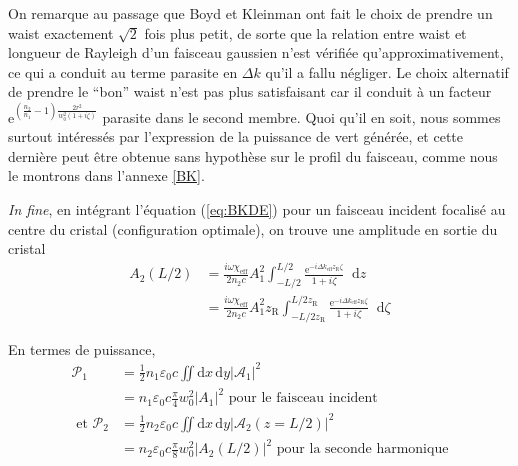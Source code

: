 \documentclass[11pt,a4paper]{article}
\newcommand{\diff}{\mathop{}\!\mathrm{d}}
\newcommand{\zr}{z_\mathsc{R}}
\renewcommand{\P}{\mathscr{P}}
\newcommand{\A}{\mathcal{A}}
\newcommand{\e}[1]{\text{e}^{#1}}
\newcommand{\mathsc}[1]{\mathrm{\scriptscriptstyle {#1}}}
\begin{document}
On remarque au passage que Boyd et Kleinman ont fait le choix de prendre un waist exactement $\sqrt{2}$ fois plus petit, de sorte que la relation entre waist et longueur de Rayleigh d'un faisceau gaussien n'est vérifiée qu'approximativement, ce qui a conduit au terme parasite en $\Delta k$ qu'il a fallu négliger. Le choix alternatif de prendre le ``bon'' waist n'est pas plus satisfaisant car il conduit à un facteur $\e{ \left(\frac{n_2}{n_1}-1\right) \frac{2 r^2}{w_0^2(1+i\zeta)}}$ parasite dans le second membre. Quoi qu'il en soit, nous sommes surtout intéressés par l'expression de la puissance de vert générée, et cette dernière peut être obtenue sans hypothèse sur le profil du faisceau, comme nous le montrons dans l'annexe \ref{BK}. 

\textit{In fine}, en intégrant l'équation (\ref{eq:BKDE}) pour un faisceau incident focalisé au centre du cristal (configuration optimale), on trouve une amplitude en sortie du cristal
\begin{align} 
	A_2(L/2) &= \frac{i\omega \chi_\mathsc{eff}}{2 n_2 c} A_1^2 \int_{-L/2}^{L/2} \frac{\e{-i\Delta k_\mathsc{eff} \zr \zeta}}{1+i\zeta} \diff z \\
	&= \frac{i\omega \chi_\mathsc{eff}}{2 n_2 c} A_1^2 \zr \int_{-L/2\zr}^{L/2\zr} \frac{\e{-i\Delta k_\mathsc{eff} \zr \zeta}}{1+i\zeta} \diff \zeta
\end{align}

En termes de puissance,
\begin{align} 
	\P_1 &= \frac12 n_1 \varepsilon_0 c \iint \mathrm dx \, \mathrm dy |\A_1|^2 \\
	&= n_1\varepsilon_0c \frac\pi4 w_0^2 |A_1|^2 \text{ pour le faisceau incident } \\
	\text{ et } \P_2 &= \frac12 n_2 \varepsilon_0 c \iint \mathrm dx \, \mathrm dy |\A_2(z=L/2)|^2 \\
	&= n_2\varepsilon_0c \frac\pi8 w_0^2 |A_2(L/2)|^2 \text{ pour la seconde harmonique}
\end{align}
\end{document}
